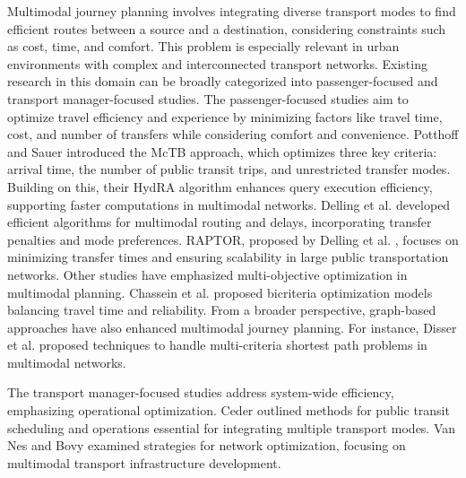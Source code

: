 Multimodal journey planning involves integrating diverse transport modes to find efficient routes between a source and a destination, considering constraints such as cost, time, and comfort. This problem is especially relevant in urban environments with complex and interconnected transport networks. Existing research in this domain can be broadly categorized into passenger-focused and transport manager-focused studies.  
The passenger-focused studies aim to optimize travel efficiency and experience by minimizing factors like travel time, cost, and number of transfers while considering comfort and convenience. Potthoff and Sauer \cite{DBLP:conf/atmos/PotthoffS22,DBLP:conf/alenex/PotthoffS22} introduced the McTB approach, which optimizes three key criteria: arrival time, the number of public transit trips, and unrestricted transfer modes. Building on this, their HydRA algorithm \cite{potthoff2022efficient} enhances query execution efficiency, supporting faster computations in multimodal networks. Delling et al. \cite{delling2009engineering,delling2008timetable,delling2015public} developed efficient algorithms for multimodal routing and delays, incorporating transfer penalties and mode preferences. RAPTOR, proposed by Delling et al. \cite{delling2015round}, focuses on minimizing transfer times and ensuring scalability in large public transportation networks. Other studies have emphasized multi-objective optimization in multimodal planning. Chassein et al. \cite{chassein2016bicriteria} proposed bicriteria optimization models balancing travel time and reliability. From a broader perspective, graph-based approaches have also enhanced multimodal journey planning. For instance, Disser et al. \cite{disser2008multi} proposed techniques to handle multi-criteria shortest path problems in multimodal networks. 

The transport manager-focused studies address system-wide efficiency, emphasizing operational optimization. Ceder \cite{ceder2016public} outlined methods for public transit scheduling and operations essential for integrating multiple transport modes. Van Nes and Bovy \cite{van2002multilevel} examined strategies for network optimization, focusing on multimodal transport infrastructure development.
